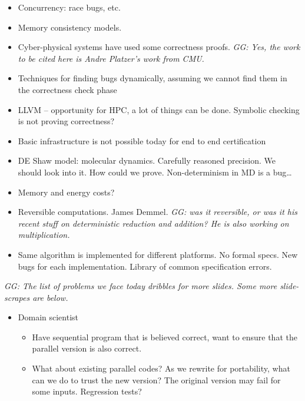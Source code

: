 \begin{tiny}
\begin{itemize}
\item  Concurrency: race bugs, etc.

\item  Memory consistency models. 

\item  Cyber-physical systems  have used some correctness proofs. {\small\em GG: Yes, the work to be cited here is
Andre Platzer's work from CMU.}

\item  Techniques for finding bugs dynamically, assuming we cannot find them in the correctness check phase

\item  LLVM – opportunity for HPC, a lot of things can be done. Symbolic checking is not proving correctness? 

\item  Basic infrastructure is not possible today for end to end certification


\item  DE Shaw model: molecular dynamics. Carefully reasoned precision. We should look into it. How could we prove. Non-determinism in MD is a bug…

\item  Memory and energy costs?

\item  Reversible computations. James Demmel. {\small\em GG: was it reversible, or was it his recent stuff on deterministic reduction and addition? He is also working on multiplication.}

\item  Same algorithm is implemented for different platforms. No formal specs. New bugs for each implementation. Library of common specification errors. 

\end{itemize}
      
    {\small\em GG: The list of problems we face today dribbles for more slides. Some more slide-scrapes are below.}
    
 
\begin{itemize}
\item Domain scientist
 \begin{itemize}
\item  Have sequential program that is believed correct, want to ensure that the parallel version is also correct. 

\item  What about existing parallel codes? As we rewrite for portability, what can we do to trust the new version? The original version may fail for some inputs. Regression tests? 


\end{itemize}
\end{itemize}
\end{tiny}
